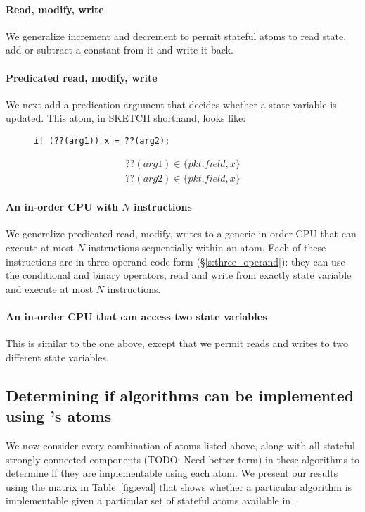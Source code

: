 \paragraph{Read, modify, write}
We generalize increment and decrement to permit stateful atoms to read state,
add or subtract a constant from it and write it back.

\paragraph{Predicated read, modify, write}
We next add a predication argument that decides whether a state variable is
updated. This atom, in SKETCH shorthand, looks like:
\begin{figure}
\begin{lstlisting}[style=customc]
  if (??(arg1)) x = ??(arg2);
\end{lstlisting}
\begin{eqnarray*}
  ??(arg1) \in \{pkt.field, x\} \\
  ??(arg2) \in \{pkt.field, x\}
\end{eqnarray*}
\end{figure}

\paragraph{An in-order CPU with $N$ instructions}
We generalize predicated read, modify, writes to a generic in-order CPU that
can execute at most $N$ instructions sequentially within an atom. Each of these
instructions are in three-operand code form (\S\ref{s:three_operand}): they can
use the conditional and binary operators, read and write from exactly state
variable and execute at most $N$ instructions.

\paragraph{An in-order CPU that can access two state variables}
This is similar to the one above, except that we permit reads and writes to two
different state variables.

\subsection{Determining if algorithms can be implemented using \absmachine's atoms}

We now consider every combination of atoms listed above, along with all
stateful strongly connected components (TODO: Need better term) in these
algorithms to determine if they are implementable using each atom. We present
our results using the matrix in Table~\ref{fig:eval} that shows whether a
particular algorithm is implementable given a particular set of stateful atoms
available in \absmachine.

